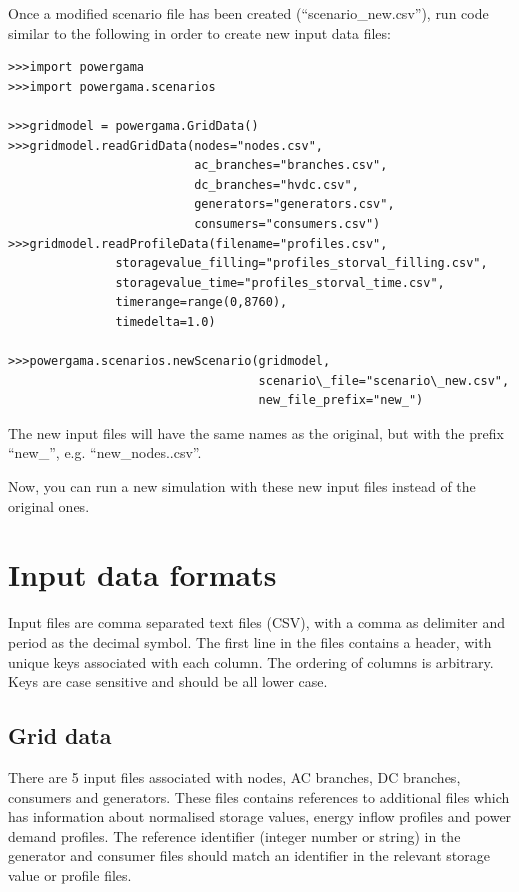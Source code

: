 \documentclass{article}
\begin{document}
Once a modified scenario file has been created (``scenario\_new.csv''), run code similar to the following in order to create new input data files:

\begin{lstlisting}
>>>import powergama
>>>import powergama.scenarios

>>>gridmodel = powergama.GridData()
>>>gridmodel.readGridData(nodes="nodes.csv",
                          ac_branches="branches.csv",
                          dc_branches="hvdc.csv",
                          generators="generators.csv",
                          consumers="consumers.csv")
>>>gridmodel.readProfileData(filename="profiles.csv",
               storagevalue_filling="profiles_storval_filling.csv",
               storagevalue_time="profiles_storval_time.csv",
               timerange=range(0,8760), 
               timedelta=1.0)
            
>>>powergama.scenarios.newScenario(gridmodel, 
                                   scenario\_file="scenario\_new.csv", 
                                   new_file_prefix="new_")
\end{lstlisting}
The new input files will have the same names as the original, but with the prefix ``new\_'', e.g. ``new\_nodes..csv''.

Now, you can run a new simulation with these new input files instead of the original ones.



\section{Input data formats}
Input files are comma separated text files (CSV), with a comma as delimiter and period as the decimal symbol. The first line in the files contains a header, with unique keys associated with each column. The ordering of columns is arbitrary. Keys are case sensitive and should be all lower case.

\subsection{Grid data}
There are 5 input files associated with nodes, AC branches, DC branches, consumers and generators. These files contains references to additional files which has information about normalised storage values, energy inflow profiles and power demand profiles. The reference identifier (integer number or string) in the generator and consumer files should match an identifier in the relevant storage value or profile files.
\end{document}
